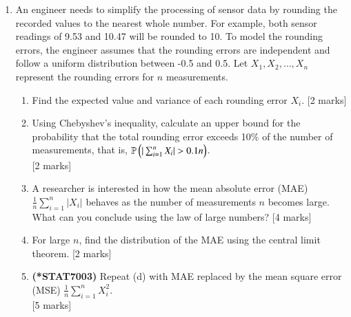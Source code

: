\documentclass[12pt]{article}
\begin{document}
\begin{enumerate}
\vspace{5pt}
\item An engineer needs to simplify the processing of sensor data by rounding the recorded values to the nearest whole number. For example, both sensor readings of 9.53 and 10.47 will be rounded to 10. To model the rounding errors, the engineer assumes that the rounding errors are independent and follow a uniform distribution between -0.5 and 0.5. Let $X_1, X_2, \ldots, X_n$ represent the rounding errors for $n$ measurements.  

\begin{enumerate}
\item Find the expected value and variance of each rounding error $X_i$.
			\hfill [2 marks]
%
\item Using Chebyshev's inequality, calculate an upper bound for the probability that the total rounding error exceeds 10\% of the number of measurements, that is, ${\mathbb P}\left(|\sum_{i=1}^n X_i| > 0.1 n\right)$. 
			\\\phantom{1}\hfill [2 marks]
%
\item A researcher is interested in how the mean absolute error (MAE) $\frac{1}{n} \sum_{i=1}^n |X_i|$ behaves as the number of measurements $n$ becomes large. What can you conclude using the law of large numbers?
			\hfill [4 marks]
%
\item For large $n$, find the distribution of the MAE using the central limit theorem. 
			\hfill [2 marks]
%
\item 
{\bf (*STAT7003)} Repeat (d) with MAE replaced by the mean square error (MSE) $\frac{1}{n} \sum_{i=1}^n X_i^2$. 
			\\\phantom{1}\hfill [5 marks]
%
\end{enumerate}


\end{enumerate}
\end{document}
